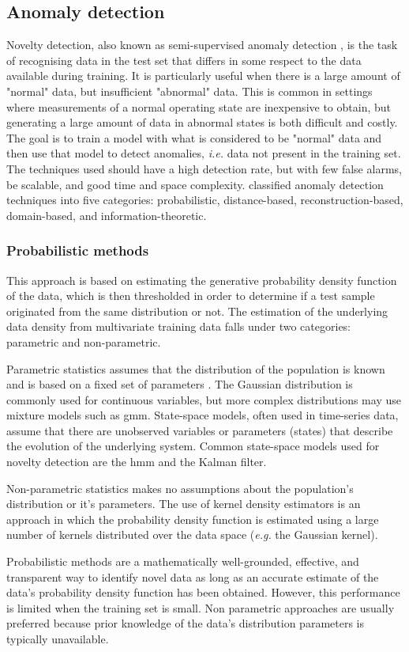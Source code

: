 \subsection{Anomaly detection}

Novelty detection, also known as semi-supervised anomaly detection \citep{Scikit-learn-novelty_detection}, is the task of recognising data in the test set that differs in some respect to the data available during training. It is particularly useful when there is a large amount of "normal" data, but insufficient "abnormal" data. This is common in settings where measurements of a normal operating state are inexpensive to obtain, but generating a large amount of data in abnormal states is both difficult and costly. The goal is to train a model with what is considered to be "normal" data and then use that model to detect anomalies, \textit{i.e.} data not present in the training set. The techniques used should have a high detection rate, but with few false alarms, be scalable, and good time and space complexity. \cite{pimentel2014review} classified anomaly detection techniques into five categories: probabilistic, distance-based, reconstruction-based, domain-based, and information-theoretic.

\subsubsection{Probabilistic methods}

This approach is based on estimating the generative probability density function of the data, which is then thresholded in order to determine if a test sample originated from the same distribution or not. The estimation of the underlying data density from multivariate training data falls under two categories: parametric and non-parametric.\par
Parametric statistics assumes that the distribution of the population is known and is based on a fixed set of parameters \citep{IBM_ParatericStatistics}. The Gaussian distribution is commonly used for continuous variables, but more complex distributions may use mixture models such as \gls{gmm}. State-space models, often used in time-series data, assume that there are unobserved variables or parameters (states) that describe the evolution of the underlying system. Common state-space models used for novelty detection are the \gls{hmm} and the Kalman filter.\par
Non-parametric statistics makes no assumptions about the population's distribution or it's parameters. The use of kernel density estimators is an approach in which the probability density function is estimated using a large number of kernels distributed over the data space (\textit{e.g.} the Gaussian kernel).\par
Probabilistic methods are a mathematically well-grounded, effective, and transparent way to identify novel data as long as an accurate estimate of the data's probability density function has been obtained. However, this performance is limited when the training set is small. Non parametric approaches are usually preferred because prior knowledge of the data's distribution parameters is typically unavailable.


